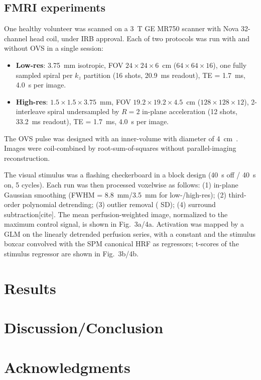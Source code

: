 \documentclass[12pt]{article}
\begin{document}
\subsection{FMRI experiments}
One healthy volunteer was scanned on a 3~T GE MR750 scanner
with Nova 32-channel head coil, 
under IRB approval.
Each of two protocols was run with and without OVS in a single session:
\begin{itemize}
  \item \textbf{Low-res}: 3.75~mm isotropic,
  FOV $24\times24\times6$~cm ($64\times64\times16$),
  one fully sampled spiral per $k_z$ partition
  (16 shots, 20.9~ms readout), TE = 1.7~ms, 4.0~s per image.
  \item \textbf{High-res}: $1.5\times1.5\times3.75$~mm,
  FOV $19.2\times19.2\times4.5$~cm ($128\times128\times12$),
  2-interleave spiral undersampled by $R=2$ in-plane acceleration
  (12 shots, 33.2~ms readout), TE = 1.7~ms, 4.0~s per image.
\end{itemize}
The OVS pulse was designed with an inner-volume with diameter of 4~cm~\cite{he2026improved}.  
Images were coil-combined by root-sum-of-squares without parallel-imaging
reconstruction.

The visual stimulus was a flashing checkerboard in a block design
(40~s off / 40~s on, 5 cycles).
Each run was then processed voxelwise as follows:
(1) in-plane Gaussian smoothing (FWHM = 8.8~mm/3.5~mm for low-/high-res);
(2) third-order polynomial detrending;
(3) outlier removal ( SD);
(4) surround subtraction[cite].
The mean perfusion-weighted image,
normalized to the maximum control signal, is shown in Fig.~3a/4a.
Activation was mapped by a GLM on the linearly detrended perfusion series,
with a constant and the stimulus boxcar convolved with the SPM canonical HRF as regressors;
t-scores of the stimulus regressor are shown in Fig.~3b/4b.


\section{Results}


\section{Discussion/Conclusion}

\section{Acknowledgments}






\end{document}
